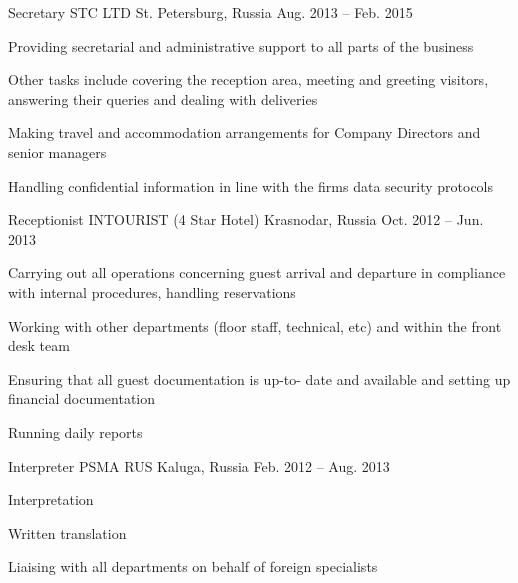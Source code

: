 \begin{cventries}
  \cventry
    {Secretary} %
    {STC LTD} %
    {St. Petersburg, Russia} %
    {Aug. 2013 -- Feb. 2015} %
    {
      \begin{cvitems} %
        \item {Providing secretarial and administrative support to all parts of the business}
        \item {Other tasks include covering the reception area, meeting and greeting visitors, answering their queries and dealing with deliveries}
        \item {Making travel and accommodation arrangements for Company Directors and senior managers}
        \item {Handling confidential information in line with the firms data security protocols}
      \end{cvitems}
    }

  \cventry
    {Receptionist} %
    {INTOURIST (4 Star Hotel)} %
    {Krasnodar, Russia} %
    {Oct. 2012 -- Jun. 2013} %
    {
      \begin{cvitems} %
        \item {Carrying out all operations concerning guest arrival and departure in compliance with internal procedures, handling reservations}
        \item {Working with other departments (floor staff, technical, etc) and within the front desk team}
        \item {Ensuring that all guest documentation is up-to- date and available and setting up financial documentation}
        \item {Running daily reports}
      \end{cvitems}
    }

  \cventry
    {Interpreter} %
    {PSMA RUS} %
    {Kaluga, Russia} %
    {Feb. 2012 -- Aug. 2013} %
    {
      \begin{cvitems} %
        \item {Interpretation}
        \item {Written translation}
        \item {Liaising with all departments on behalf of foreign specialists}
      \end{cvitems}
    }


\end{cventries}

